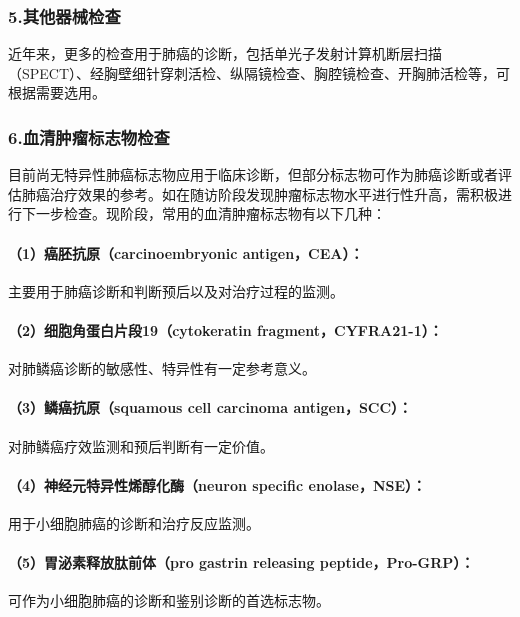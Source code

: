 \subsubsection{5.其他器械检查}

近年来，更多的检查用于肺癌的诊断，包括单光子发射计算机断层扫描（SPECT）、经胸壁细针穿刺活检、纵隔镜检查、胸腔镜检查、开胸肺活检等，可根据需要选用。

\subsubsection{6.血清肿瘤标志物检查}

目前尚无特异性肺癌标志物应用于临床诊断，但部分标志物可作为肺癌诊断或者评估肺癌治疗效果的参考。如在随访阶段发现肿瘤标志物水平进行性升高，需积极进行下一步检查。现阶段，常用的血清肿瘤标志物有以下几种：

\paragraph{（1）癌胚抗原（carcinoembryonic antigen，CEA）：}

主要用于肺癌诊断和判断预后以及对治疗过程的监测。

\paragraph{（2）细胞角蛋白片段19（cytokeratin fragment，CYFRA21-1）：}

对肺鳞癌诊断的敏感性、特异性有一定参考意义。

\paragraph{（3）鳞癌抗原（squamous cell carcinoma antigen，SCC）：}

对肺鳞癌疗效监测和预后判断有一定价值。

\paragraph{（4）神经元特异性烯醇化酶（neuron specific enolase，NSE）：}

用于小细胞肺癌的诊断和治疗反应监测。

\paragraph{（5）胃泌素释放肽前体（pro gastrin releasing peptide，Pro-GRP）：}

可作为小细胞肺癌的诊断和鉴别诊断的首选标志物。


